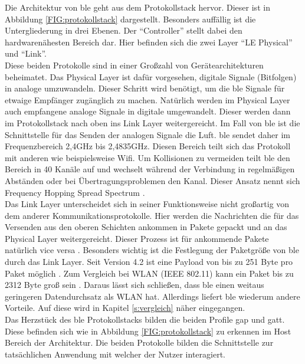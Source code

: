 \noindent Die Architektur von \ac{ble} geht aus dem Protokollstack hervor. Dieser ist in Abbildung \ref{FIG:protokollstack} dargestellt. Besonders auffällig ist die Untergliederung in drei Ebenen. Der "`Controller"' stellt dabei den hardwarenähesten Bereich dar. Hier befinden sich die zwei Layer "`LE Physical"' und "`Link"'.\\

\noindent Diese beiden Protokolle sind in einer Großzahl von Gerätearchitekturen beheimatet. Das Physical Layer ist dafür vorgesehen, digitale Signale (Bitfolgen) in analoge umzuwandeln. Dieser Schritt wird benötigt, um die \ac{ble} Signale für etwaige Empfänger zugänglich zu machen. Natürlich werden im Physical Layer auch empfangene analoge Signale in digitale umgewandelt. Dieser werden dann im Protokollstack nach oben ins Link Layer weitergereicht. Im Fall von \ac{ble} ist die Schnittstelle für das Senden der analogen Signale die Luft. \ac{ble} sendet daher im Frequenzbereich 2,4GHz bis 2,4835GHz. Diesen Bereich teilt sich das Protokoll mit anderen wie beispielsweise Wifi. Um Kollisionen zu vermeiden teilt \ac{ble} den Bereich in 40 Kanäle auf und wechselt während der Verbindung in regelmäßigen Abständen oder bei Übertragungsproblemen den Kanal. Dieser Ansatz nennt sich Frequency Hopping Spread Spectrum \cite[Seite 16f]{Townsend14:GSB}.\\      

\noindent Das Link Layer unterscheidet sich in seiner Funktionsweise nicht großartig von dem anderer Kommunikationsprotokolle. Hier werden die Nachrichten die für das  Versenden aus den oberen Schichten ankommen in Pakete gepackt und an das Physical Layer weitergereicht. Dieser Prozess ist für ankommende Pakete natürlich vice versa \cite[Seit 194]{Tanenbaum14:CN}. Besonders wichtig ist die Festlegung der Paketgröße von \ac{ble} durch das Link Layer. Seit Version 4.2 ist eine Payload von bis zu 251 Byte pro Paket möglich \cite{Gupta:WWW}. Zum Vergleich bei WLAN (IEEE 802.11) kann ein Paket bis zu 2312 Byte groß sein \cite[Seite 233]{Gessler15:WNN}. Daraus lässt sich schließen, dass \ac{ble} einen weitaus geringeren Datendurchsatz als WLAN hat. Allerdings liefert \ac{ble} wiederum andere Vorteile. Auf diese wird in Kapitel \ref{s:vergleich} näher eingegangen.\\

\noindent Das Herzstück des \ac{ble} Protokollstacks bilden die beiden Profile \ac{gap} und \ac{gatt}. Diese befinden sich wie in Abbildung \ref{FIG:protokollstack} zu erkennen im Host Bereich der Architektur. Die beiden Protokolle bilden die Schnittstelle zur tatsächlichen Anwendung mit welcher der Nutzer interagiert.\\

